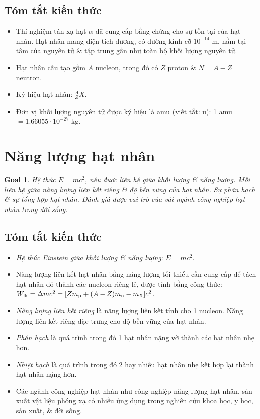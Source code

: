 \documentclass{article}
\newtheorem{goal}{Goal}
\begin{document}
\subsection{Tóm tắt kiến thức}

\begin{itemize}
	\item Thí nghiệm tán xạ hạt $\alpha$ đã cung cấp bằng chứng cho sự tồn tại của hạt nhân. Hạt nhân mang điện tích dương, có đường kính cỡ $10^{-14}$ m, nằm tại tâm của nguyên tử \& tập trung gần như toàn bộ khối lượng nguyên tử.
	\item Hạt nhân cấu tạo gồm $A$ nucleon, trong đó có $Z$ proton \& $N = A - Z$ neutron.
	\item Ký hiệu hạt nhân: ${}_Z^AX$.
	\item Đơn vị khối lượng nguyên tử được ký hiệu là amu (viết tắt: u): 1 amu $= 1.66055\cdot10^{-27}$ kg.
\end{itemize}


\section{Năng lượng hạt nhân}

\begin{goal}
	Hệ thức $E = mc^2$, nêu được liên hệ giữa khối lượng \& năng lượng. Mối liên hệ giữa năng lượng liên kết riêng \& độ bền vững của hạt nhân. Sự phân hạch \& sự tổng hợp hạt nhân. Đánh giá được vai trò của vài ngành công nghiệp hạt nhân trong đời sống.
\end{goal}

\subsection{Tóm tắt kiến thức}

\begin{itemize}
	\item {\it Hệ thức Einstein giữa khối lượng \& năng lượng}: $E = mc^2$.
	\item Năng lượng liên kết hạt nhân bằng năng lượng tối thiểu cần cung cấp để tách hạt nhân đó thành các nucleon riêng lẻ, được tính bằng công thức: $W_{\rm lk} = \Delta mc^2 = [Zm_{\rm p} + (A - Z)m_{\rm n} - m_{\rm X}]c^2$.
	\item {\it Năng lượng liên kết riêng} là năng lượng liên kết tính cho 1 nucleon. Năng lượng liên kết riêng đặc trưng cho độ bền vững của hạt nhân.
	\item {\it Phân hạch} là quá trình trong đó 1 hạt nhân nặng vỡ thành các hạt nhân nhẹ hơn.
	\item {\it Nhiệt hạch} là quá trình trong đó 2 hay nhiều hạt nhân nhẹ kết hợp lại thành hạt nhân nặng hơn.
	\item Các ngành công nghiệp hạt nhân như công nghiệp năng lượng hạt nhân, sản xuất vật liệu phóng xạ có nhiều ứng dụng trong nghiên cứu khoa học, y học, sản xuất, \& đời sống.
\end{itemize}
\end{document}
